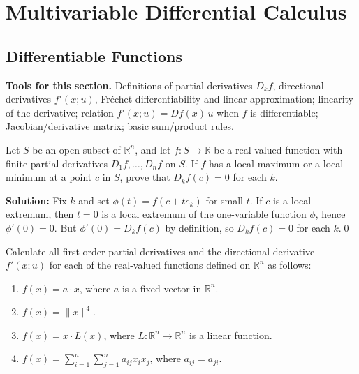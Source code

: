 \chapter{Multivariable Differential Calculus}

\section{Differentiable Functions}

\noindent\textbf{Tools for this section.} Definitions of partial derivatives $D_k f$, directional derivatives $f'(x;u)$, Fréchet differentiability and linear approximation; linearity of the derivative; relation $f'(x;u)=Df(x)\,u$ when $f$ is differentiable; Jacobian/derivative matrix; basic sum/product rules.



\begin{problembox}
Let \( S \) be an open subset of \( \mathbb{R}^n \), and let \( f: S \to \mathbb{R} \) be a real-valued function with finite partial derivatives \( D_1f, \ldots, D_nf \) on \( S \). If \( f \) has a local maximum or a local minimum at a point \( c \) in \( S \), prove that \( D_kf(c) = 0 \) for each \( k \).
\end{problembox}

\noindent\textbf{Solution:}
Fix $k$ and set $\phi(t)=f(c+te_k)$ for small $t$. If $c$ is a local extremum, then $t=0$ is a local extremum of the one-variable function $\phi$, hence $\phi'(0)=0$. But $\phi'(0)=D_k f(c)$ by definition, so $D_k f(c)=0$ for each $k$.\qed


\begin{problembox}
Calculate all first-order partial derivatives and the directional derivative \( f'(x; u) \) for each of the real-valued functions defined on \( \mathbb{R}^n \) as follows:
\begin{enumerate}[label=(\alph*)]
\item \( f(x) = a \cdot x \), where \( a \) is a fixed vector in \( \mathbb{R}^n \).
\item \( f(x) = \|x\|^4 \).
\item \( f(x) = x \cdot L(x) \), where \( L : \mathbb{R}^n \to \mathbb{R}^n \) is a linear function.
\item \( f(x) = \sum_{i=1}^{n} \sum_{j=1}^{n} a_{ij}x_i x_j \), where \( a_{ij} = a_{ji} \).
\end{enumerate}
\end{problembox}

